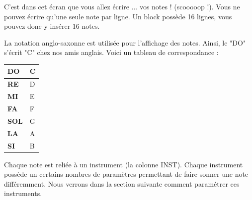 \documentclass[12pt,a4paper]{article}
\begin{document}
    C'est dans cet écran que vous allez écrire ... vos notes ! (scooooop !).
    Vous ne pouvez écrire qu'une seule note par ligne.
    Un block possède 16 lignes, vous pouvez donc y insérer 16 notes.
    \medskip
    
    La notation anglo-saxonne est utilisée pour l'affichage des notes.
    Ainsi, le "DO" s'écrit "C" chez nos amis anglais.
    Voici un tableau de correspondance :
    \medskip
    
    \begin{center}
        \tablelasttail{\hline}
        \begin{supertabular}{|l|l|}
        \hline
            {\bf DO} & C \\
            \hline
            {\bf RE} & D \\
            \hline
            {\bf MI} & E \\
            \hline
            {\bf FA} & F \\
            \hline
            {\bf SOL} & G \\
            \hline
            {\bf LA} & A \\
            \hline
            {\bf SI} & B \\
        \hline
        \end{supertabular}
    \end{center}

    
    Chaque note est reliée à un instrument (la colonne INST).
    Chaque instrument possède un certains nombres de paramètres permettant de faire sonner une note différemment.
    Nous verrons dans la section suivante comment paramétrer ces instruments.
    
    
\end{document}
